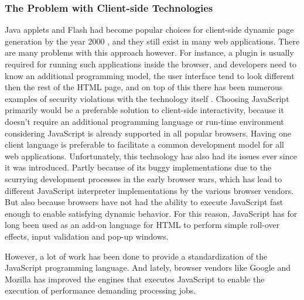 \subsubsection{The Problem with Client-side Technologies}
Java applets and Flash had become popular choices for client-side dynamic page generation by the year 2000 \cite[p.2-3]{spa}, and they still exist in many web applications. There are many problems with this approach however. For instance, a plugin is usually required for running such applications inside the browser, and developers need to know an additional programming model, the user interface tend to look different then the rest of the HTML page, and on top of this there has been numerous examples of security violations with the technology itself \cite[p.875-877]{tanumbaum}. Choosing JavaScript primarily would be a preferable solution to client-side interactivity, because it doesn't require an additional programming language or run-time environment considering JavaScript is already supported in all popular browsers. Having one client language is preferable to facilitate a common development model for all web applications. Unfortunately, this technology has also had its issues ever since it was introduced. Partly because of its buggy implementations due to the scurrying development processes in the early browser wars, which has lead to different JavaScript interpreter implementations by the various browser vendors. But also because browsers have not had the ability to execute JavaScript fast enough to enable satisfying dynamic behavior. For this reason, JavaScript has for long been used as an add-on language for HTML to perform simple roll-over effects, input validation and pop-up windows.  

However, a lot of work has been done to provide a standardization of the JavaScript programming language. And lately, browser vendors like Google\cite{google} and Mozilla\cite{mozilla} has improved the engines that executes JavaScript to enable the execution of performance demanding processing jobs. 

